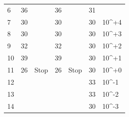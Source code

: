 \begin{table}[!ht]
\begin{tabular}{lllllll}
		\multicolumn{1}{l|}{6}  & 36                           & \multicolumn{1}{l|}{}                              & 36                            & \multicolumn{1}{l|}{}                              & \cellcolor[HTML]{FFCC67}31 &                                                \\
		\multicolumn{1}{l|}{7}  & 30                           & \multicolumn{1}{l|}{}                              & 30                            & \multicolumn{1}{l|}{}                              & \cellcolor[HTML]{32CB00}30 & \cellcolor[HTML]{32CB00}10\textasciicircum{}+4 \\
		\multicolumn{1}{l|}{8}  & 30                           & \multicolumn{1}{l|}{}                              & 30                            & \multicolumn{1}{l|}{}                              & \cellcolor[HTML]{32CB00}30 & \cellcolor[HTML]{32CB00}10\textasciicircum{}+3 \\
		\multicolumn{1}{l|}{9}  & 32                           & \multicolumn{1}{l|}{}                              & 32                            & \multicolumn{1}{l|}{}                              & \cellcolor[HTML]{32CB00}30 & \cellcolor[HTML]{32CB00}10\textasciicircum{}+2 \\
		\multicolumn{1}{l|}{10} & 39                           & \multicolumn{1}{l|}{}                              & 39                            & \multicolumn{1}{l|}{}                              & \cellcolor[HTML]{32CB00}30 & \cellcolor[HTML]{32CB00}10\textasciicircum{}+1 \\
		\multicolumn{1}{l|}{11} & \cellcolor[HTML]{FD6864}26   & \multicolumn{1}{l|}{\cellcolor[HTML]{FD6864}Stop}  & \cellcolor[HTML]{FD6864}26    & \multicolumn{1}{l|}{\cellcolor[HTML]{FD6864}Stop}  & \cellcolor[HTML]{32CB00}30 & \cellcolor[HTML]{32CB00}10\textasciicircum{}+0 \\
		\multicolumn{1}{l|}{12} &                              & \multicolumn{1}{l|}{}                              &                               & \multicolumn{1}{l|}{}                              & \cellcolor[HTML]{32CB00}33 & \cellcolor[HTML]{32CB00}10\textasciicircum{}-1 \\
		\multicolumn{1}{l|}{13} &                              & \multicolumn{1}{l|}{}                              &                               & \multicolumn{1}{l|}{}                              & \cellcolor[HTML]{32CB00}33 & \cellcolor[HTML]{32CB00}10\textasciicircum{}-2 \\
		\multicolumn{1}{l|}{14} &                              & \multicolumn{1}{l|}{}                              &                               & \multicolumn{1}{l|}{}                              & \cellcolor[HTML]{32CB00}30 & \cellcolor[HTML]{32CB00}10\textasciicircum{}-3 \\

\end{tabular}
\end{table}
